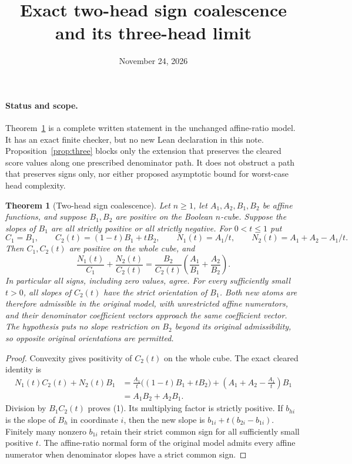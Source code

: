 \documentclass[11pt]{article}
\title{Exact two-head sign coalescence and its three-head limit}
\author{}
\date{November 24, 2026}
\newtheorem{theorem}{Theorem}
\begin{document}
\maketitle

\paragraph{Status and scope.}
Theorem~\ref{thm:two} is a complete written statement in the unchanged
affine-ratio model. It has an exact finite checker, but no new Lean
declaration in this note. Proposition~\ref{prop:three} blocks only the
extension that preserves the cleared score values along one prescribed
denominator path. It does not obstruct a path that preserves signs only,
nor either proposed asymptotic bound for worst-case head complexity.

\begin{theorem}[Two-head sign coalescence]\label{thm:two}
Let $n\geq1$, let $A_1,A_2,B_1,B_2$ be affine functions, and suppose
$B_1,B_2$ are positive on the Boolean $n$-cube. Suppose the slopes of
$B_1$ are all strictly positive or all strictly negative. For $0<t\leq1$
put
\[
 C_1=B_1,\qquad C_2(t)=(1-t)B_1+tB_2,
 \qquad N_1(t)=A_1/t,\qquad N_2(t)=A_1+A_2-A_1/t.
\]
Then $C_1,C_2(t)$ are positive on the whole cube, and
\[
 \frac{N_1(t)}{C_1}+\frac{N_2(t)}{C_2(t)}
 =\frac{B_2}{C_2(t)}
   \left(\frac{A_1}{B_1}+\frac{A_2}{B_2}\right).
 \tag{1}
\]
In particular all signs, including zero values, agree. For every
sufficiently small $t>0$, all slopes of $C_2(t)$ have the strict
orientation of $B_1$. Both new atoms are therefore admissible in the
original model, with unrestricted affine numerators, and their
denominator coefficient vectors approach the same coefficient vector.
The hypothesis puts no slope restriction on $B_2$ beyond its original
admissibility, so opposite original orientations are permitted.
\end{theorem}

\begin{proof}
Convexity gives positivity of $C_2(t)$ on the whole cube. The exact
cleared identity is
\[
 \begin{aligned}
 N_1(t)C_2(t)+N_2(t)B_1
 &=\frac{A_1}{t}\big((1-t)B_1+tB_2\big)
   +\left(A_1+A_2-\frac{A_1}{t}\right)B_1\\
 &=A_1B_2+A_2B_1.
 \end{aligned}
\]
Division by $B_1C_2(t)$ proves (1). Its multiplying factor is strictly
positive. If $b_{hi}$ is the slope of $B_h$ in coordinate $i$, then the
new slope is $b_{1i}+t(b_{2i}-b_{1i})$. Finitely many nonzero $b_{1i}$
retain their strict common sign for all sufficiently small positive
$t$. The affine-ratio normal form of the original model admits every
affine numerator when denominator slopes have a strict common sign.
\end{proof}
\end{document}
